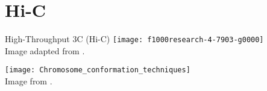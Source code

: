 \section{Hi-C}

\begin{frame}[c]{High-Throughput 3C (Hi-C)}
    \normalsize
    \texttt{[image: f1000research-4-7903-g0000]} \\
    Image adapted from \cite{wingett2015hicup}.
\end{frame}

\begin{frame}[c]%
    \normalsize
    \texttt{[image: Chromosome\_conformation\_techniques]} \\
    Image from \cite{Li2014}.
\end{frame}


%  



